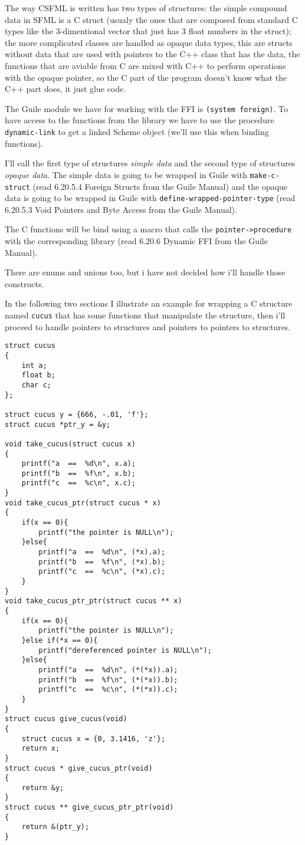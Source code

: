 \documentclass[latterpaper, leqno]{article}
\begin{document}
The way CSFML is written has two types of structures: the simple compound data in SFML is a C struct (usualy the ones that are composed from standard C types like the 3-dimentional vector that just has 3 float numbers in the struct); the more complicated classes are handled as opaque data types, this are structs without data that are used with pointers to the C++ class that has the data, the functions that are aviable from C are mixed with C++ to perform operations with the opaque pointer, so the C part of the program doesn't know what the C++ part does, it just glue code.

The Guile module we have for working with the FFI is \texttt{(system foreign)}. To have access to the functions from the library we have to use the procedure \texttt{dynamic-link} to get a linked Scheme object (we'll use this when binding functions).

I'll call the first type of structures \emph{simple data} and the second type of structures \emph{opaque data}. The simple data is going to be wrapped in Guile with \texttt{make-c-struct} (read 6.20.5.4 Foreign Structs from the Guile Manual) and the opaque data is going to be wrapped in Guile with \texttt{define-wrapped-pointer-type} (read 6.20.5.3 Void Pointers and Byte Access from the Guile Manual).

The C functions will be bind using a macro that calls the \texttt{pointer->procedure} with the corresponding library (read 6.20.6 Dynamic FFI from the Guile Manual).

There are enums and unions too, but i have not decided how i'll handle those constructs.

\bigskip

In the following two sections I illustrate an example for wrapping a C structure named \texttt{cucus} that has some functions that manipulate the structure, then i'll proceed to handle pointers to structures and pointers to pointers to structures.

\begin{verbatim}
struct cucus
{
    int a;
    float b;
    char c;
};

struct cucus y = {666, -.01, 'f'};
struct cucus *ptr_y = &y;

void take_cucus(struct cucus x)
{
    printf("a  ==  %d\n", x.a);
    printf("b  ==  %f\n", x.b);
    printf("c  ==  %c\n", x.c);
}
void take_cucus_ptr(struct cucus * x)
{
    if(x == 0){
        printf("the pointer is NULL\n");
    }else{
        printf("a  ==  %d\n", (*x).a);
        printf("b  ==  %f\n", (*x).b);
        printf("c  ==  %c\n", (*x).c);
    }
}
void take_cucus_ptr_ptr(struct cucus ** x)
{
    if(x == 0){
        printf("the pointer is NULL\n");
    }else if(*x == 0){
        printf("dereferenced pointer is NULL\n");
    }else{
        printf("a  ==  %d\n", (*(*x)).a);
        printf("b  ==  %f\n", (*(*x)).b);
        printf("c  ==  %c\n", (*(*x)).c);
    }
}
struct cucus give_cucus(void)
{
    struct cucus x = {0, 3.1416, 'z'};
    return x;
}
struct cucus * give_cucus_ptr(void)
{
    return &y;
}
struct cucus ** give_cucus_ptr_ptr(void)
{
    return &(ptr_y);
}
\end{verbatim}
\end{document}
